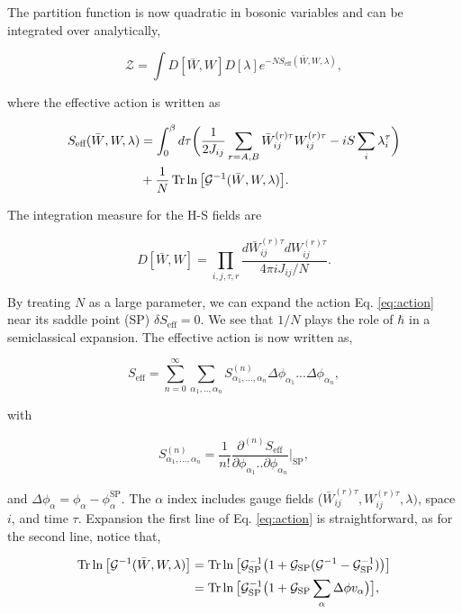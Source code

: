 \documentclass{article}
\begin{document}
The partition function is now quadratic in bosonic variables and can
be integrated over analytically,

\begin{equation}
\mathcal{Z}=\int D[\bar{W},W]D[\lambda]e^{-NS_{\text{eff}}(\bar{W},W,\lambda)},
\end{equation}

where the effective action is written as

\begin{align}
S_{\text{eff}}(\bar{W},W,\lambda) & =\int_{0}^{\beta}d\tau\bigg(\frac{1}{2J_{ij}}\sum_{r=A,B}\bar{W}_{ij}^{(r)\tau}W_{ij}^{(r)\tau}-iS\sum_{i}\lambda_{i}^{\tau}\bigg)\nonumber \\
 & +\frac{1}{N}\Tr\ln\big[\mathcal{G}^{-1}(\bar{W},W,\lambda)\big].\label{eq:action}
\end{align}

The integration measure for the H-S fields are 

\begin{equation}
D[\bar{W},W]=\prod_{i,j,\tau,r}\frac{d\bar{W}_{ij}^{(r)\tau}dW_{ij}^{(r)\tau}}{4\pi iJ_{ij}/N}.
\end{equation}

By treating $N$ as a large parameter, we can expand the action Eq.
\eqref{eq:action} near its saddle point (SP) $\delta S_{\text{eff}}=0$.
We see that $1/N$ plays the role of $\hbar$ in a semiclassical expansion.
The effective action is now written as, 

\begin{equation}
S_{\text{eff}}=\sum_{n=0}^{\infty}\sum_{\alpha_{1},..,\alpha_{n}}S_{\alpha_{1},...,\alpha_{n}}^{(n)}\Delta\phi_{\alpha_{1}}...\Delta\phi_{\alpha_{n}},
\end{equation}

with 

\begin{equation}
S_{\alpha_{1},...,\alpha_{n}}^{(n)}=\frac{1}{n!}\frac{\partial^{(n)}S_{\text{eff}}}{\partial\phi_{\alpha_{1}}..\partial\phi_{\alpha_{n}}}\bigg|_{\text{SP}},
\end{equation}

and $\Delta\phi_{\alpha}=\phi_{\alpha}-\phi_{\alpha}^{\text{SP}}$.
The $\alpha$ index includes gauge fields ($\bar{W}_{ij}^{(r)\tau},W_{ij}^{(r)\tau},\lambda)$,
space $i$, and time $\tau$. Expansion the first line of Eq. \eqref{eq:action}
is straightforward, as for the second line, notice that, 

\begin{align}
\Tr\ln\big[\mathcal{G}^{-1}(\bar{W},W,\lambda)\big] & =\Tr\ln\big[\mathcal{G}_{\text{SP}}^{-1}\big(1+\mathcal{G}_{\text{SP}}(\mathcal{G}^{-1}-\mathcal{G}_{\text{SP}}^{-1})\big)\big]\nonumber \\
 & =\Tr\ln\big[\mathcal{G}_{\text{SP}}^{-1}\big(1+\mathcal{G}_{\text{SP}}\sum_{\alpha}\Delta\phi v_{\alpha}\big)\big],
\end{align}
\end{document}
